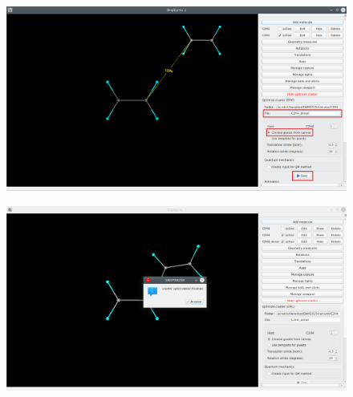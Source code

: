 \documentclass[a4paper,10pt]{article}
\begin{document}
\begin{minipage}{.5\linewidth}
\begin{figure}[H]
\caption{\label{fig:51}}
\begin{center}
\includegraphics[width=0.95\linewidth]{damqt_QS_fig51_b.png}
\end{center}
\end{figure} 
\end{minipage}
\begin{minipage}{.5\linewidth}
\begin{figure}[H]
\caption{\label{fig:52}}
\begin{center}
\includegraphics[width=0.95\linewidth]{damqt_QS_fig52.png}
\end{center}
\end{figure} 
\end{minipage}
\end{document}
